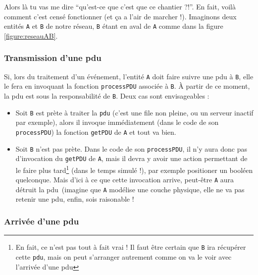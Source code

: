 \documentclass{article}
\begin{document}
   Alors là tu vas me dire ``qu'est-ce que c'est que ce chantier
?!''. En fait, voilà comment c'est censé fonctionner (et ça a l'air
de marcher !). Imaginons deux entités {\tt A} et {\tt B} de notre
réseau, {\tt B} étant en aval de {\tt A} comme dans la figure
\ref{figure:reseauAB}.

%
\subsubsection{Transmission d'une {\sc pdu}}

   Si, lors du traitement d'un événement, l'entité {\tt A} doit faire
suivre une {\sc pdu} à {\tt B}, elle le fera en invoquant la fonction
\lstinline!processPDU! associée à {\tt B}. À partir de ce moment, la
{\sc pdu} est sous la responsabilité de {\tt B}. Deux cas sont
envisageables : 

\begin{itemize}
   \item Soit {\tt B} est prète à traiter la {\tt pdu} (c'est une file
     non pleine, ou un serveur inactif par exemple), alors il invoque
     immédiatement (dans le code de son \lstinline!processPDU!) la
     fonction \lstinline!getPDU! de {\tt A} et tout va bien.
   \item Soit {\tt B} n'est pas prète. Dans le code de son
     \lstinline!processPDU!, il n'y aura donc pas d'invocation du
     \lstinline!getPDU! de {\tt A}, mais il devra y avoir une action
     permettant de le faire plus tard\footnote{En fait, ce n'est pas
       tout à fait vrai ! Il faut être certain que {\tt B} ira
       récupérer cette {\tt pdu}, mais on peut s'arranger autrement
       comme on va le voir avec l'arrivée d'une {\sc pdu}} (dans le temps simulé !), par
     exemple positioner un booléen quelconque. Mais d'ici à ce que
     cette invocation arrive, peut-être {\tt A} aura détruit la {\sc
       pdu} (imagine que {\tt A} modélise une couche physique, elle ne
     va pas retenir une {\sc pdu}, enfin, sois raisonable !
\end{itemize}

%
\subsubsection{Arrivée d'une {\sc pdu}}
\end{document}
